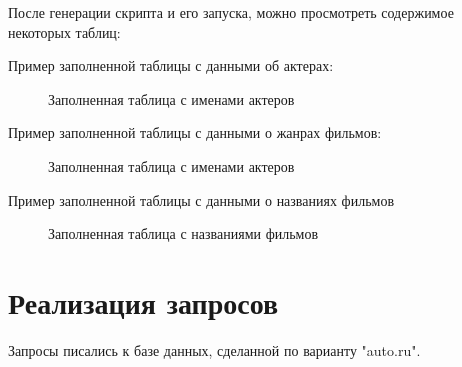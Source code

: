 После генерации скрипта и его запуска, можно просмотреть содержимое некоторых таблиц:

Пример заполненной таблицы с данными об актерах:
\begin{figure} [H]
    \center{\texttt{[image: ex1]}}
    \caption{Заполненная таблица с именами актеров}
\end{figure}

Пример заполненной таблицы с данными о жанрах фильмов:
\begin{figure} [H]
    \caption{Заполненная таблица с именами актеров}
\end{figure}

Пример заполненной таблицы с данными о названиях фильмов
\begin{figure}
    \caption{Заполненная таблица с названиями фильмов}
\end{figure}

\section{Реализация запросов}
Запросы писались к базе данных, сделанной по варианту "auto.ru". 

